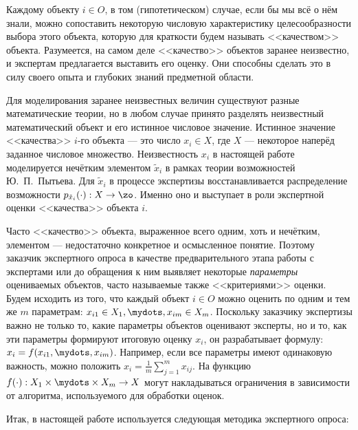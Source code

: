 Каждому объекту $i \in O$, в том (гипотетическом) случае, если бы мы всё о нём знали, можно сопоставить некоторую числовую характеристику целесообразности выбора этого объекта, которую для краткости будем называть <<качеством>> объекта. Разумеется, на самом деле <<качество>> объектов заранее неизвестно, и экспертам предлагается выставить его оценку. Они способны сделать это в силу своего опыта и глубоких знаний предметной области.

Для моделирования заранее неизвестных величин существуют разные математические теории, но в любом случае принято разделять неизвестный математический объект и его истинное числовое значение. Истинное значение <<качества>> $i$-го объекта --- это число $x_i \in X$, где $X$ --- некоторое наперёд заданное числовое множество. Неизвестность $x_i$ в настоящей работе моделируется нечётким элементом $\tilde x_i$ в рамках теории возможностей Ю.~П.~Пытьева. Для $\tilde x_i$ в процессе экспертизы восстанавливается распределение возможности $p_{\tilde x_i}(\cdot): X \rightarrow \zo$. Именно оно и выступает в роли экспертной оценки <<качества>> объекта $i$.  

Часто <<качество>> объекта, выраженное всего одним, хоть и нечётким, элементом --- недостаточно конкретное и осмысленное понятие. Поэтому заказчик экспертного опроса в качестве предварительного этапа работы с экспертами или до обращения к ним выявляет некоторые {\sl параметры} оцениваемых объектов, часто называемые также <<критериями>> оценки. Будем исходить из того, что каждый объект $i \in O$ можно оценить по одним и тем же $m$ параметрам: $x_{i1} \in X_1, \mydots, x_{im} \in X_m$.  Поскольку заказчику экспертизы важно не только то, какие параметры объектов оценивают эксперты, но и то, как эти параметры формируют итоговую оценку $x_i$, он разрабатывает формулу: $x_i = f(x_{i1}, \mydots, x_{im})$. Например, если все параметры имеют одинаковую важность, можно положить $x_i = \frac{1}{m}\sum_{j=1}^m{x_{ij}}$. На функцию $f(\cdot): X_1 \times \mydots \times X_m \rightarrow X$ могут накладываться ограничения в зависимости от алгоритма, используемого для обработки оценок. 


Итак, в настоящей работе используется следующая методика экспертного опроса:
\begin{center}  \end{center}

